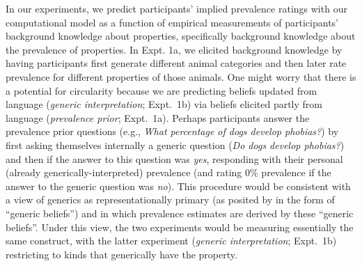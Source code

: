 \documentclass[floatsintext,doc]{apa6}
\begin{document}
In our experiments, we predict participants' implied prevalence ratings with our computational model as a function of empirical measurements of participants' background knowledge about properties, specifically background knowledge about the prevalence of properties. 
In Expt. 1a, we elicited background knowledge by having participants first generate different animal categories and then later rate prevalence for different properties of those animals.
One might worry that there is a potential for circularity because we are predicting beliefs updated from language (\emph{generic interpretation}; Expt.~1b) via beliefs elicited partly from language (\emph{prevalence prior}; Expt.~1a).
Perhaps participants answer the prevalence prior questions (e.g., \emph{What percentage of dogs develop phobias?}) by first asking themselves internally a generic question (\emph{Do dogs develop phobias?}) and then  if the answer to this question was \emph{yes}, responding with their personal (already generically-interpreted) prevalence (and rating 0\% prevalence if the answer to the generic question was \emph{no}).
This procedure would be consistent with a view of generics as representationally primary (as posited by  in the form of \enquote{generic beliefs}) and in which prevalence estimates are derived by these \enquote{generic beliefs}. 
Under this view, the two experiments would be measuring essentially the same construct, with the latter experiment (\emph{generic interpretation}; Expt.~1b) restricting to  kinds that generically have the property. 
\end{document}
